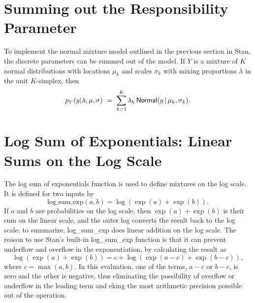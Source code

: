 \section{Summing out the Responsibility Parameter}

To implement the normal mixture model outlined in the previous
section in Stan, the discrete parameters can be summed out of the
model. If $Y$ is a mixture of $K$ normal distributions with
locations $\mu_k$ and scales $\sigma_k$ with mixing proportions
$\lambda$ in the unit $K$-simplex, then
\[
p_Y(y | \lambda, \mu, \sigma)
\ = \
\sum_{k=1}^K \lambda_k \, \mbox{\sf Normal}(y \, | \, \mu_k, \sigma_k).
\]

\section{Log Sum of Exponentials: Linear Sums on the Log Scale}

The log sum of exponentials function is used to define mixtures on the
log scale.  It is defined for two inputs by
%
\[
\mbox{log\_sum\_exp}(a, b) = \log (\exp(a) + \exp(b)).
\]
%
If $a$ and $b$ are probabilities on the log scale, then $\exp(a) +
\exp(b)$ is their sum on the linear scale, and the outer log converts
the result back to the log scale; to summarize, log\_sum\_exp does
linear addition on the log scale.   The reason to use Stan's built-in
log\_sum\_exp function is that it can prevent underflow and overflow
in the exponentiation, by calculating the result as
%
\[
\log\left( \exp(a) + \exp(b)\right)
= c
  + \log \left( \exp(a - c) + \exp(b - c) \right),
\]
%
where $c = \max(a, b)$.
In this evaluation, one of the terms, $a - c$ or $b -
c$, is zero and the other is negative, thus eliminating the
possibility of overflow or underflow in the leading term and eking the
most arithmetic precision possible out of the operation.

